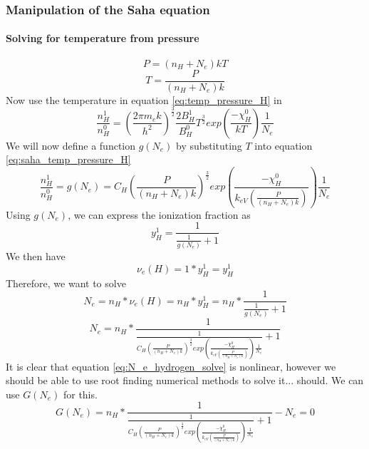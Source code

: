 \documentclass{article}
\begin{document}
			\subsubsection{Manipulation of the Saha equation}
				\paragraph{Solving for temperature from pressure}
					\begin{equation*}
						P = (n_H + N_e) k T 
					\end{equation*}
					\begin{equation} \label{eq:temp_pressure_H}
						T = \frac{P}{(n_H + N_e) k}
					\end{equation}
					Now use the temperature in equation \ref{eq:temp_pressure_H} in 
					\begin{equation} \label{eq:saha_temp_pressure_H}
						\frac{n^{1}_H}{n^0_H} =  
						\left( \frac{2 \pi m_e k}{h^2} \right)^\frac{3}{2} \frac{2 B^{1}_H}{B^0_H}
						T^\frac{3}{2} exp\left(\frac{-\chi^0_H}{kT}\right) \frac{1}{N_e}
					\end{equation}
					We will now define a function $g(N_e)$ by substituting $T$ into 
					equation \ref{eq:saha_temp_pressure_H}
					\begin{equation}
						\frac{n^{1}_H}{n^0_H} = g(N_e) = C_H \left(\frac{P}{(n_H + N_e) k}\right)^\frac{3}{2}
						exp\left(\frac{-\chi^0_H}{k_{eV}\left(\frac{P}{(n_H + N_e) k}\right)}\right) 
						\frac{1}{N_e}
					\end{equation}
					Using $g(N_e)$, we can express the ionization fraction as
					\begin{equation} 
						y^1_H = \frac{1}{\frac{1}{g(N_e)} + 1}
					\end{equation}
					We then have
					\begin{equation}
						\nu_e(H) = 1*y^1_H = y^1_H
					\end{equation}
					Therefore, we want to solve
					\begin{equation} 
						N_{e} = n_H * \nu_e(H) = n_H * y^1_H = n_H * \frac{1}{\frac{1}{g(N_e)} + 1}
					\end{equation}
					\begin{equation} \label{eq:N_e_hydrogen_solve} 
						N_{e} = n_H * \frac{1}{\frac{1}{C_H \left(\frac{P}{(n_H + N_e) k}\right)^\frac{3}{2}
						exp\left(\frac{-\chi^0_H}{k_{eV}\left(\frac{P}{(n_H + N_e) k}\right)}\right) 
						\frac{1}{N_e}} + 1}
					\end{equation}
					It is clear that equation \ref{eq:N_e_hydrogen_solve} is nonlinear, however we should
					be able to use root finding numerical methods to solve it... should. We can use $G(N_e)$
					for this.
					\begin{equation} \label{eq:N_e_hydrogen_solve_zero} 
						G(N_e) = n_H * \frac{1}{\frac{1}{C_H \left(\frac{P}{(n_H + N_e) k}\right)^\frac{3}{2}
						exp\left(\frac{-\chi^0_H}{k_{eV}\left(\frac{P}{(n_H + N_e) k}\right)}\right) 
						\frac{1}{N_e}} + 1} - N_e = 0
					\end{equation}
\end{document}
